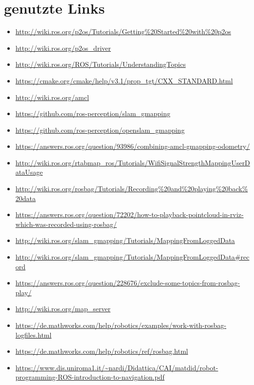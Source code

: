 \documentclass{scrartcl}%
\begin{document}
\section{genutzte Links}
\begin{itemize}
	\item \url{http://wiki.ros.org/p2os/Tutorials/Getting%20Started%20with%20p2os}
		\item \url{http://wiki.ros.org/p2os_driver}
		\item \url{http://wiki.ros.org/ROS/Tutorials/UnderstandingTopics}
		\item \url{https://cmake.org/cmake/help/v3.1/prop_tgt/CXX_STANDARD.html}
		\item \url{http://wiki.ros.org/amcl}
		\item \url{https://github.com/ros-perception/slam\_gmapping}
		\item \url{https://github.com/ros-perception/openslam\_gmapping}
		\item \url{https://answers.ros.org/question/93986/combining-amcl-gmapping-odometry/}
		\item \url{http://wiki.ros.org/rtabmap_ros/Tutorials/WifiSignalStrengthMappingUserDataUsage}
		\item \url{http://wiki.ros.org/rosbag/Tutorials/Recording%20and%20playing%20back%20data}
		\item \url{https://answers.ros.org/question/72202/how-to-playback-pointcloud-in-rviz-which-was-recorded-using-rosbag/}
		\item \url{http://wiki.ros.org/slam_gmapping/Tutorials/MappingFromLoggedData}
		\item \url{http://wiki.ros.org/slam_gmapping/Tutorials/MappingFromLoggedData#record}
		\item \url{https://answers.ros.org/question/228676/exclude-some-topics-from-rosbag-play/}
		\item \url{http://wiki.ros.org/map_server}
		\item \url{https://de.mathworks.com/help/robotics/examples/work-with-rosbag-logfiles.html}
		\item \url{https://de.mathworks.com/help/robotics/ref/rosbag.html}
		\item \url{https://www.dis.uniroma1.it/~nardi/Didattica/CAI/matdid/robot-programming-ROS-introduction-to-navigation.pdf}
	\end{itemize}
\end{document}
